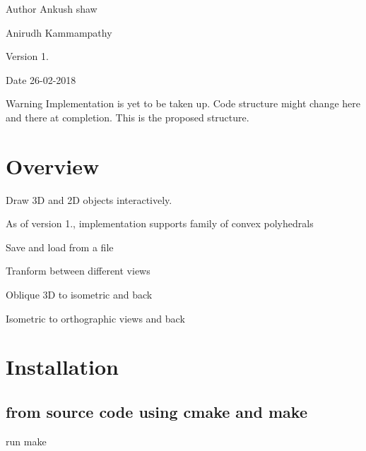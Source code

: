 \begin{DoxyAuthor}{Author}
Ankush shaw 

Anirudh Kammampathy 
\end{DoxyAuthor}
\begin{DoxyVersion}{Version}
1. 
\end{DoxyVersion}
\begin{DoxyDate}{Date}
26-\/02-\/2018 
\end{DoxyDate}
\begin{DoxyWarning}{Warning}
Implementation is yet to be taken up. Code structure might change here and there at completion. This is the proposed structure.
\end{DoxyWarning}
\hypertarget{index_Functionality}{}\section{Overview}\label{index_Functionality}

\begin{DoxyEnumerate}
\item Draw 3D and 2D objects interactively.
\item As of version 1., implementation supports family of convex polyhedrals
\item Save and load from a file
\item Tranform between different views
\begin{DoxyItemize}
\item Oblique 3D to isometric and back
\item Isometric to orthographic views and back
\end{DoxyItemize}
\end{DoxyEnumerate}\hypertarget{index_Installation}{}\section{Installation}\label{index_Installation}
\hypertarget{index_Build}{}\subsection{from source code using cmake and make}\label{index_Build}

\begin{DoxyEnumerate}
\item run make 
\end{DoxyEnumerate}